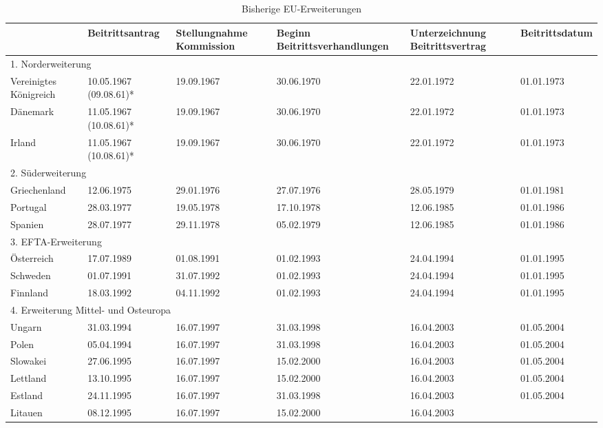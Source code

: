 \begin{table}[H]\vspace{1ex}\centering
\caption{Bisherige EU-Erweiterungen}
\footnotesize
\begin{tabular}{|p{2cm}|p{2cm}|p{2cm}|p{2cm}|p{2cm}|p{2cm}|}\hline
&Beitritts\-antrag&Stellung\-nahme Kommis\-sion&Beginn Beitritts\-verhand\-lungen&Unter\-zeichnung Beitritts\-vertrag&Beitritts\-datum\\\hline
\multicolumn{6}{|p{12cm}|}{1. Norderweiterung} \\\hline 
Vereinigtes Königreich&
10.05.1967 (09.08.61)*&
19.09.1967&
30.06.1970&
22.01.1972&
01.01.1973\\\hline
Dänemark&
11.05.1967 (10.08.61)*&
19.09.1967&
30.06.1970&
22.01.1972&
01.01.1973\\\hline
Irland&
11.05.1967 (10.08.61)*&
19.09.1967&
30.06.1970&
22.01.1972&
01.01.1973\\\hline
\multicolumn{6}{|p{12cm}|}{2. Süderweiterung}\\\hline
Griechenland &
12.06.1975&
29.01.1976&
27.07.1976&
28.05.1979&
01.01.1981\\\hline
Portugal&
28.03.1977&
19.05.1978&
17.10.1978&
12.06.1985&
01.01.1986\\\hline
Spanien&
28.07.1977&
29.11.1978&
05.02.1979&
12.06.1985&
01.01.1986\\\hline
\multicolumn{6}{|p{12cm}|}{3. EFTA-Erweiterung}\\\hline
Österreich&
17.07.1989&
01.08.1991&
01.02.1993&
24.04.1994&
01.01.1995\\\hline
Schweden&
01.07.1991&
31.07.1992&
01.02.1993&
24.04.1994&
01.01.1995\\\hline
Finnland&
18.03.1992&
04.11.1992&
01.02.1993&
24.04.1994&
01.01.1995\\\hline
\multicolumn{6}{|p{12cm}|}{4. Erweiterung Mittel- und Osteuropa}\\\hline
Ungarn&
31.03.1994&
16.07.1997&
31.03.1998&
16.04.2003&
01.05.2004\\\hline
Polen&
05.04.1994&
16.07.1997&
31.03.1998&
16.04.2003&
01.05.2004\\\hline
Slowakei&
27.06.1995&
16.07.1997&
15.02.2000&
16.04.2003&
01.05.2004\\\hline
Lettland&
13.10.1995&
16.07.1997&
15.02.2000&
16.04.2003&
01.05.2004\\\hline
Estland&
24.11.1995&
16.07.1997&
31.03.1998&
16.04.2003&
01.05.2004\\\hline
Litauen&
08.12.1995&
16.07.1997&
15.02.2000&
16.04.2003&

\end{tabular}
\end{table}
